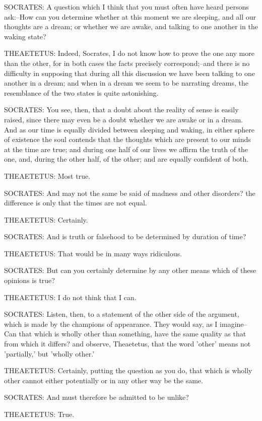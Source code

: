 SOCRATES: A question which I think that you must often have heard
persons ask:--How can you determine whether at this moment we are
sleeping, and all our thoughts are a dream; or whether we are awake, and
talking to one another in the waking state?

THEAETETUS: Indeed, Socrates, I do not know how to prove the one
any more than the other, for in both cases the facts precisely
correspond;--and there is no difficulty in supposing that during all
this discussion we have been talking to one another in a dream; and when
in a dream we seem to be narrating dreams, the resemblance of the two
states is quite astonishing.

SOCRATES: You see, then, that a doubt about the reality of sense is
easily raised, since there may even be a doubt whether we are awake
or in a dream. And as our time is equally divided between sleeping
and waking, in either sphere of existence the soul contends that the
thoughts which are present to our minds at the time are true; and during
one half of our lives we affirm the truth of the one, and, during the
other half, of the other; and are equally confident of both.

THEAETETUS: Most true.

SOCRATES: And may not the same be said of madness and other disorders?
the difference is only that the times are not equal.

THEAETETUS: Certainly.

SOCRATES: And is truth or falsehood to be determined by duration of
time?

THEAETETUS: That would be in many ways ridiculous.

SOCRATES: But can you certainly determine by any other means which of
these opinions is true?

THEAETETUS: I do not think that I can.

SOCRATES: Listen, then, to a statement of the other side of the
argument, which is made by the champions of appearance. They would say,
as I imagine--Can that which is wholly other than something, have the
same quality as that from which it differs? and observe, Theaetetus,
that the word 'other' means not 'partially,' but 'wholly other.'

THEAETETUS: Certainly, putting the question as you do, that which is
wholly other cannot either potentially or in any other way be the same.

SOCRATES: And must therefore be admitted to be unlike?

THEAETETUS: True.

